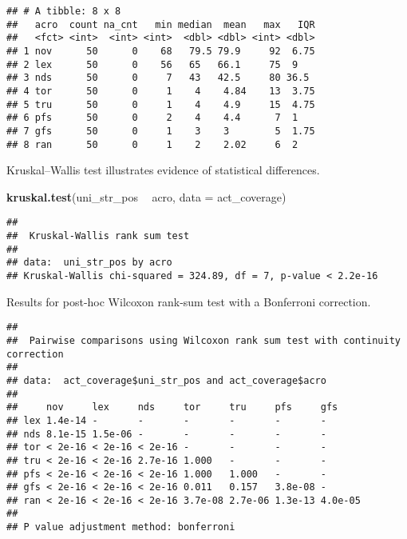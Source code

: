 \documentclass[]{book}
\newenvironment{Shaded}{\begin{snugshade}}{\end{snugshade}}
\newcommand{\DataTypeTok}[1]{\textcolor[rgb]{0.13,0.29,0.53}{#1}}
\newcommand{\KeywordTok}[1]{\textcolor[rgb]{0.13,0.29,0.53}{\textbf{#1}}}
\newcommand{\NormalTok}[1]{#1}
\newcommand{\OperatorTok}[1]{\textcolor[rgb]{0.81,0.36,0.00}{\textbf{#1}}}
\newcommand{\OtherTok}[1]{\textcolor[rgb]{0.56,0.35,0.01}{#1}}
\newcommand{\StringTok}[1]{\textcolor[rgb]{0.31,0.60,0.02}{#1}}
\begin{document}
\begin{verbatim}
## # A tibble: 8 x 8
##   acro  count na_cnt   min median  mean   max   IQR
##   <fct> <int>  <int> <int>  <dbl> <dbl> <int> <dbl>
## 1 nov      50      0    68   79.5 79.9     92  6.75
## 2 lex      50      0    56   65   66.1     75  9   
## 3 nds      50      0     7   43   42.5     80 36.5 
## 4 tor      50      0     1    4    4.84    13  3.75
## 5 tru      50      0     1    4    4.9     15  4.75
## 6 pfs      50      0     2    4    4.4      7  1   
## 7 gfs      50      0     1    3    3        5  1.75
## 8 ran      50      0     1    2    2.02     6  2
\end{verbatim}

Kruskal--Wallis test illustrates evidence of statistical differences.

\begin{Shaded}
\begin{Highlighting}[]
\KeywordTok{kruskal.test}\NormalTok{(uni_str_pos }\OperatorTok{~}\StringTok{ }\NormalTok{acro, }\DataTypeTok{data =}\NormalTok{ act_coverage)}
\end{Highlighting}
\end{Shaded}

\begin{verbatim}
## 
##  Kruskal-Wallis rank sum test
## 
## data:  uni_str_pos by acro
## Kruskal-Wallis chi-squared = 324.89, df = 7, p-value < 2.2e-16
\end{verbatim}

Results for post-hoc Wilcoxon rank-sum test with a Bonferroni correction.

\begin{Shaded}
\end{Shaded}

\begin{verbatim}
## 
##  Pairwise comparisons using Wilcoxon rank sum test with continuity correction 
## 
## data:  act_coverage$uni_str_pos and act_coverage$acro 
## 
##     nov     lex     nds     tor     tru     pfs     gfs    
## lex 1.4e-14 -       -       -       -       -       -      
## nds 8.1e-15 1.5e-06 -       -       -       -       -      
## tor < 2e-16 < 2e-16 < 2e-16 -       -       -       -      
## tru < 2e-16 < 2e-16 2.7e-16 1.000   -       -       -      
## pfs < 2e-16 < 2e-16 < 2e-16 1.000   1.000   -       -      
## gfs < 2e-16 < 2e-16 < 2e-16 0.011   0.157   3.8e-08 -      
## ran < 2e-16 < 2e-16 < 2e-16 3.7e-08 2.7e-06 1.3e-13 4.0e-05
## 
## P value adjustment method: bonferroni
\end{verbatim}
\end{document}
